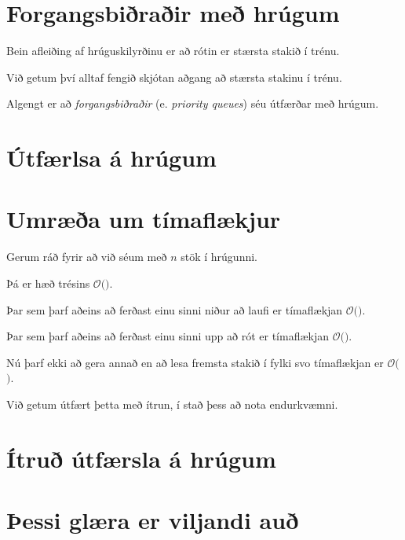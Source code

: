 \section{Forgangsbiðraðir með hrúgum}
{
    {
        \item<1-> Bein afleiðing af hrúguskilyrðinu er að rótin er stærsta stakið í trénu.
        \item<2-> Við getum því alltaf fengið skjótan aðgang að stærsta stakinu í trénu.
        \item<3-> Algengt er að \emph{forgangsbiðraðir} (e. \emph{priority queues}) séu útfærðar með hrúgum.
    }
}

\section{Útfærlsa á hrúgum}
{
}

\section{Umræða um tímaflækjur}
{
    {
        \item<1-> Gerum ráð fyrir að við séum með $n$ stök í hrúgunni.
        \item<2-> Þá er hæð trésins $\mathcal{O}($$)$.
        \item<4-> Þar sem  þarf aðeins að ferðast einu sinni niður að laufi er tímaflækjan $\mathcal{O}($$)$.
        \item<6-> Þar sem  þarf aðeins að ferðast einu sinni upp að rót er tímaflækjan $\mathcal{O}($$)$.
        \item<8-> Nú þarf  ekki að gera annað en að lesa fremsta stakið í fylki svo tímaflækjan er $\mathcal{O}($$)$.
        \item<10-> Við getum útfært þetta með ítrun, í stað þess að nota endurkvæmni.
    }
}

\section{Ítruð útfærsla á hrúgum}
{
}

\section{Þessi glæra er viljandi auð}
{
}


